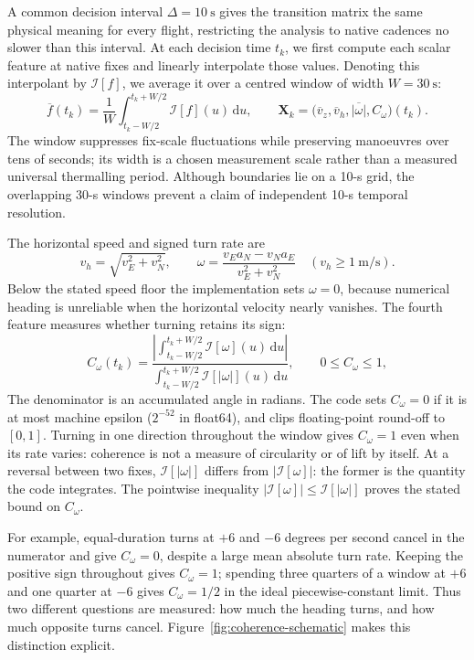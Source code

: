 A common decision interval $\Delta=\SI{10}{\second}$ gives the transition matrix the
same physical meaning for every flight, restricting the analysis to native cadences no
slower than this interval. At each decision time $t_k$, we first compute each scalar
feature at native fixes and linearly interpolate those values. Denoting this interpolant
by $\mathcal I[f]$, we average it over a centred window of width $W=\SI{30}{\second}$:
\begin{equation}
 \overline f(t_k)=\frac{1}{W}\int_{t_k-W/2}^{t_k+W/2}\mathcal I[f](u)\,\mathrm du,
 \qquad
 \mathbf X_k=\bigl(\overline v_z,\overline v_h,
                  \overline{|\omega|},C_\omega\bigr)(t_k).
 \label{eq:phasefeatures}
\end{equation}
The window suppresses fix-scale fluctuations while preserving manoeuvres over tens of
seconds; its width is a chosen measurement scale rather than a measured universal
thermalling period.
Although boundaries lie on a 10-s grid, the overlapping 30-s windows prevent a claim of
independent 10-s temporal resolution.

The horizontal speed and signed turn rate are
\begin{equation}
 v_h=\sqrt{v_E^2+v_N^2},\qquad
 \omega=\frac{v_Ea_N-v_Na_E}{v_E^2+v_N^2}
 \quad (v_h\ge\SI{1}{\metre\per\second}).
 \label{eq:turnrate}
\end{equation}
Below the stated speed floor the implementation sets $\omega=0$, because numerical
heading is unreliable when the horizontal velocity nearly vanishes. The fourth feature
measures whether turning retains its sign:
\begin{equation}
 C_\omega(t_k)=
 \frac{\left|\int_{t_k-W/2}^{t_k+W/2}\mathcal I[\omega](u)\,\mathrm du\right|}
      {\int_{t_k-W/2}^{t_k+W/2}\mathcal I[|\omega|](u)\,\mathrm du},
 \qquad 0\le C_\omega\le1,
 \label{eq:turncoherence}
\end{equation}
The denominator is an accumulated angle in radians. The code sets $C_\omega=0$ if
it is at most machine epsilon ($2^{-52}$ in float64), and clips floating-point round-off
to $[0,1]$. Turning in one direction
throughout the window gives $C_\omega=1$ even when its rate varies: coherence is not a
measure of circularity or of lift by itself. At a reversal between two fixes,
$\mathcal I[|\omega|]$ differs from $|\mathcal I[\omega]|$: the former is the
quantity the code integrates. The pointwise inequality
$|\mathcal I[\omega]|\le\mathcal I[|\omega|]$ proves the stated bound on
$C_\omega$.

For example, equal-duration turns at $+6$ and $-6$ degrees per second cancel in the
numerator and give $C_\omega=0$, despite a large mean absolute turn rate. Keeping the
positive sign throughout gives $C_\omega=1$; spending three quarters of a window at
$+6$ and one quarter at $-6$ gives $C_\omega=1/2$ in the ideal piecewise-constant limit.
Thus two different questions are measured: how much the heading turns, and how much
opposite turns cancel. Figure~\ref{fig:coherence-schematic} makes this distinction explicit.

